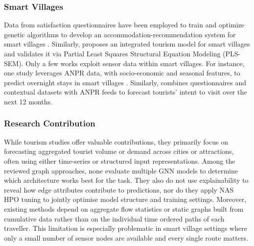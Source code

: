 \documentclass[journal]{IEEEtran}
\begin{document}
\subsubsection{Smart Villages}

Data from satisfaction questionnaires have been employed to train and optimize genetic algorithms to develop an accommodation-recommendation system for smart villages \cite{suanpang2024can}. Similarly, \cite{surya2024tourism} proposes an integrated tourism model for smart villages and validates it via Partial Least Squares Structural Equation Modeling (PLS-SEM). Only a few works exploit sensor data within smart villages. For instance, one study leverages ANPR data, with socio-economic and seasonal features, to predict overnight stays in smart villages \cite{bolanos2024predicting}. Similarly, \cite{bolanos2025sasd} combines questionnaires and contextual datasets with ANPR feeds to forecast tourists’ intent to visit over the next 12 months.


\subsubsection{Research Contribution}

While tourism studies offer valuable contributions, they primarily focus on forecasting aggregated tourist volume or demand across cities or attractions, often using either time-series or structured input representations. Among the reviewed graph approaches, none evaluate multiple GNN models to determine which architecture works best for the task. They also do not use explainability to reveal how edge attributes contribute to predictions, nor do they apply NAS HPO tuning to jointly optimise model structure and training settings. Moreover, existing methods depend on aggregate flow statistics or static graphs built from cumulative data rather than on the individual time ordered paths of each traveller. This limitation is especially problematic in smart village settings where only a small number of sensor nodes are available and every single route matters.

\end{document}
